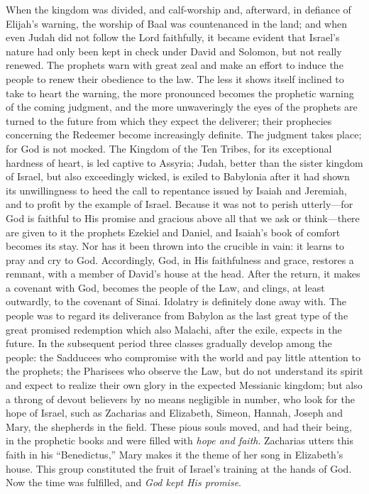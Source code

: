 When the kingdom was divided, and calf-worship and, afterward, in defiance of Elijah’s warning, the worship of Baal was countenanced in the land; and when even Judah did not follow the Lord faithfully, it became evident that Israel’s nature had only been kept in check under David and Solomon, but not really renewed. The prophets warn with great zeal and make an effort to induce the people to renew their obedience to the law. The less it shows itself inclined to take to heart the warning, the more pronounced becomes the prophetic warning of the coming judgment, and the more unwaveringly the eyes of the prophets are turned to the future from which they expect the deliverer; their prophecies concerning the Redeemer become increasingly definite. The judgment takes place; for God is not mocked. The Kingdom of the Ten Tribes, for its exceptional hardness of heart, is led captive to Assyria; Judah, better than the sister kingdom of Israel, but also exceedingly wicked, is exiled to Babylonia after it had shown its unwillingness to heed the call to repentance issued by Isaiah and Jeremiah, and to profit by the example of Israel. Because it was not to perish utterly—for God is faithful to His promise and gracious above all that we ask or think—there are given to it the prophets Ezekiel and Daniel, and Isaiah’s book of comfort becomes its stay. Nor has it been thrown into the crucible in vain: it learns to pray and cry to God. Accordingly, God, in His faithfulness and grace, restores a remnant, with a member of David’s house at the head. After the return, it makes a covenant with God, becomes the people of the Law, and clings, at least outwardly, to the covenant of Sinai. Idolatry is definitely done away with. The people was to regard its deliverance from Babylon as the last great type of the great promised redemption which also Malachi, after the exile, expects in the future. In the subsequent period three classes gradually develop among the people: the Sadducees who compromise with the world and pay little attention to the prophets; the Pharisees who observe the Law, but do not understand its spirit and expect to realize their own glory in the expected Messianic kingdom; but also a throng of devout believers by no means negligible in number, who look for the hope of Israel, such as Zacharias and Elizabeth, Simeon, Hannah, Joseph and Mary, the
shepherds in the field. These pious souls moved, and had their being, in the prophetic books and were filled with \emph{hope and faith}. Zacharias utters this faith in his “Benedictus,” Mary makes it the theme of her song in Elizabeth’s house. This group constituted the fruit of Israel’s training at the hands of God. Now the time was fulfilled, and \emph{God kept His promise}.

